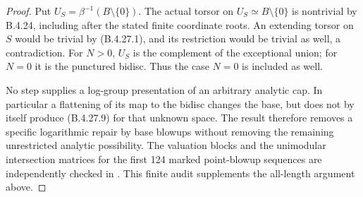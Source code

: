 \begin{proof}
Put $U_S=\beta^{-1}(B\setminus\{0\})$.
The actual torsor on $U_S\simeq B\setminus\{0\}$
is nontrivial by B.4.24, including after the
stated finite coordinate roots. An extending
torsor on $S$ would be trivial by (B.4.27.1),
and its restriction would be trivial as well,
a contradiction. For $N>0$, $U_S$ is the
complement of the exceptional union; for
$N=0$ it is the punctured bidisc. Thus the
case $N=0$ is included as well.

No step supplies a log-group presentation of
an arbitrary analytic cap. In particular a
flattening of its map to the bidisc changes
the base, but does not by itself produce
(B.4.27.9) for that unknown space. The result
therefore removes a specific logarithmic
repair by base blowups without removing the
remaining unrestricted analytic possibility.
The valuation blocks and the unimodular
intersection matrices for the first 124 marked
point-blowup sequences are independently checked
in . This finite
audit supplements the all-length argument above.
\end{proof}
